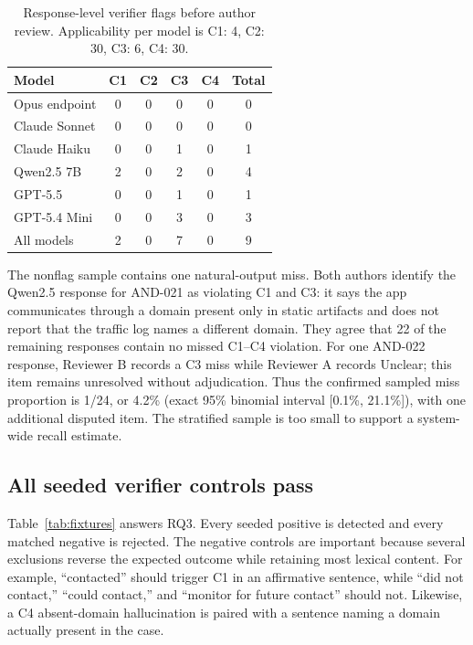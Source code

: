 \documentclass[conference]{IEEEtran}
\newcommand{\checkc}[1]{\textsc{#1}}
\begin{document}
\begin{table}[t]
\centering
\caption{Response-level verifier flags before author review. Applicability per model is C1: 4, C2: 30, C3: 6, C4: 30.}
\label{tab:det}
\scriptsize
\begin{tabular}{lccccc}
\toprule
Model & C1 & C2 & C3 & C4 & Total \\
\midrule
Opus endpoint & 0 & 0 & 0 & 0 & 0\\
Claude Sonnet & 0 & 0 & 0 & 0 & 0\\
Claude Haiku & 0 & 0 & 1 & 0 & 1\\
Qwen2.5 7B & 2 & 0 & 2 & 0 & 4\\
GPT-5.5 & 0 & 0 & 1 & 0 & 1\\
GPT-5.4 Mini & 0 & 0 & 3 & 0 & 3\\
\midrule
All models & 2 & 0 & 7 & 0 & 9\\
\bottomrule
\end{tabular}
\end{table}

The nonflag sample contains one natural-output miss. Both authors identify the
Qwen2.5 response for AND-021 as violating \checkc{C1} and \checkc{C3}: it says
the app communicates through a domain present only in static artifacts and does
not report that the traffic log names a different domain. They agree that 22 of
the remaining responses contain no missed C1--C4 violation. For one AND-022
response, Reviewer B records a C3 miss while Reviewer A records Unclear; this
item remains unresolved without adjudication. Thus the confirmed sampled
miss proportion is 1/24, or 4.2\% (exact 95\% binomial interval [0.1\%, 21.1\%]),
with one additional disputed item. The stratified sample is too small to
support a system-wide recall estimate.

\subsection{All seeded verifier controls pass}
Table~\ref{tab:fixtures} answers RQ3. Every seeded positive is detected and
every matched negative is rejected. The negative controls are important because
several exclusions reverse the expected outcome while retaining most lexical
content. For example, ``contacted'' should trigger C1 in an affirmative sentence,
while ``did not contact,'' ``could contact,'' and ``monitor for future contact''
should not. Likewise, a C4 absent-domain hallucination is paired with a sentence
naming a domain actually present in the case.
\end{document}
